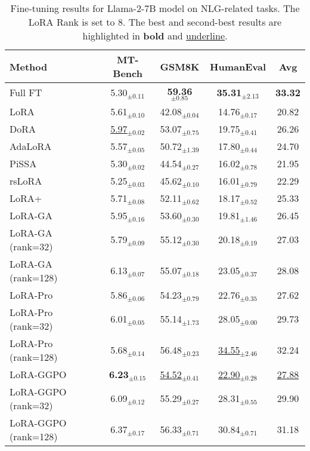 \begin{table*}[htbp]
  \centering
  \caption{Fine-tuning results for Llama-2-7B model on NLG-related tasks. The LoRA Rank is set to 8. The best and second-best results are highlighted in \textbf{bold} and {\underline{underline}}.}
    \begin{tabular}{l|ccc|c}
    \toprule
    \textbf{Method} & \textbf{MT-Bench} & \textbf{GSM8K} & \textbf{HumanEval} & \textbf{Avg} \\
    \midrule
    Full FT & 5.30$_{\pm0.11}$ & \textbf{59.36$_{\pm0.85}$} & \textbf{35.31$_{\pm2.13}$} & \textbf{33.32} \\
    LoRA  & 5.61$_{\pm0.10}$ & 42.08$_{\pm0.04}$ & 14.76$_{\pm0.17}$ & 20.82  \\
    \midrule
    DoRA  & \underline{5.97$_{\pm0.02}$} & 53.07$_{\pm0.75}$ & 19.75$_{\pm0.41}$ & 26.26  \\
    AdaLoRA & 5.57$_{\pm0.05}$ & 50.72$_{\pm1.39}$ & 17.80$_{\pm0.44}$ & 24.70  \\
    \midrule
    PiSSA & 5.30$_{\pm0.02}$ & 44.54$_{\pm0.27}$ & 16.02$_{\pm0.78}$ & 21.95  \\
    rsLoRA & 5.25$_{\pm0.03}$ & 45.62$_{\pm0.10}$ & 16.01$_{\pm0.79}$ & 22.29  \\
    LoRA+ & 5.71$_{\pm0.08}$ & 52.11$_{\pm0.62}$ & 18.17$_{\pm0.52}$ & 25.33  \\
    \midrule
    LoRA-GA & 5.95$_{\pm0.16}$ & 53.60$_{\pm0.30}$ & 19.81$_{\pm1.46}$ & 26.45  \\
    LoRA-GA (rank=32) & 5.79$_{\pm0.09}$ & 55.12$_{\pm0.30}$ & 20.18$_{\pm0.19}$ & 27.03  \\
    LoRA-GA (rank=128) & 6.13$_{\pm0.07}$ & 55.07$_{\pm0.18}$ & 23.05$_{\pm0.37}$ & 28.08  \\
    \midrule
    LoRA-Pro & 5.86$_{\pm0.06}$ & 54.23$_{\pm0.79}$ & 22.76$_{\pm0.35}$ & 27.62  \\
    LoRA-Pro (rank=32) & 6.01$_{\pm0.05}$ & 55.14$_{\pm1.73}$ & 28.05$_{\pm0.00}$ & 29.73  \\
    LoRA-Pro (rank=128) & 5.68$_{\pm0.14}$ & 56.48$_{\pm0.23}$ & \underline{34.55$_{\pm2.46}$} & 32.24  \\
    \midrule
    LoRA-GGPO & \textbf{6.23$_{\pm0.15}$} & \underline{54.52$_{\pm0.41}$} & \underline{22.90$_{\pm0.28}$} & \underline{27.88}  \\
    LoRA-GGPO (rank=32) & 6.09$_{\pm0.12}$ & 55.29$_{\pm0.27}$ & 28.31$_{\pm0.55}$ & 29.90  \\
    LoRA-GGPO (rank=128) & 6.37$_{\pm0.17}$ & 56.33$_{\pm0.71}$ & 30.84$_{\pm0.71}$ & 31.18  \\
    \bottomrule
    \end{tabular}%
  \label{tab:addlabel2}%
\end{table*}%

